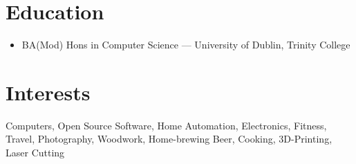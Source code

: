 \documentclass[a4paper, 10pt] {article}
\begin{document}
\section*{Education}

\begin{itemize}[noitemsep]
  \item BA(Mod) Hons in Computer Science --- University of Dublin, Trinity College
\end{itemize}

\section*{Interests}

Computers, Open Source Software, Home Automation, Electronics, Fitness, Travel, Photography, Woodwork,
Home-brewing Beer, Cooking, 3D-Printing, Laser Cutting
\end{document}
